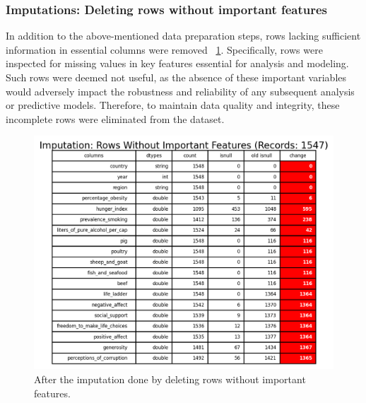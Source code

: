             \subsubsection{Imputations: Deleting rows without important features}
                In addition to the above-mentioned data preparation steps, rows lacking sufficient information in essential columns were removed \figurename~\ref{fig:dp-removed-without-important-features}. Specifically, rows were inspected for missing values in key features essential for analysis and modeling. Such rows were deemed not useful, as the absence of these important variables would adversely impact the robustness and reliability of any subsequent analysis or predictive models. Therefore, to maintain data quality and integrity, these incomplete rows were eliminated from the dataset.
                \begin{figure}[H]
                        \centering
                        \includegraphics[scale=1]{images/dp_imput_impor_feat}
                        \caption{After the imputation done by deleting rows without important features.}
                        \label{fig:dp-removed-without-important-features}
                \end{figure}

